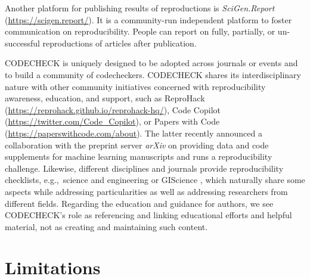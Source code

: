 \documentclass[12pt]{article}
\begin{document}
Another platform for publishing results of reproductions is
\emph{SciGen.Report} (\url{https://scigen.report/}).  It is a
community-run independent platform to foster communication on
reproducibility.  People can report on fully, partially, or
un-successful reproductions of articles after publication.

CODECHECK is uniquely designed to be adopted across journals or events
and to build a community of codecheckers. CODECHECK shares its
interdisciplinary nature with other community initiatives concerned
with reproducibility awareness, education, and support, such as
ReproHack (\url{https://reprohack.github.io/reprohack-hq/}),
Code Copilot (\url{https://twitter.com/Code_Copilot}), or
Papers with Code (\url{https://paperswithcode.com/about}).
The latter recently announced a collaboration with the preprint server
\emph{arXiv} on providing data and code supplements for machine
learning manuscripts
and runs a reproducibility challenge.
Likewise, different disciplines and journals provide reproducibility
checklists, e.g.,~science and engineering \cite{rosenberg_next_2020} or
GIScience \cite{nust_agile_2019}, which naturally share some aspects
while addressing particularities as well as addressing researchers
from different fields. Regarding the education and guidance for
authors, we see CODECHECK's role as referencing and linking
educational efforts and helpful material, not as creating and
maintaining such content.

\section*{Limitations}\label{limitations}
\end{document}
